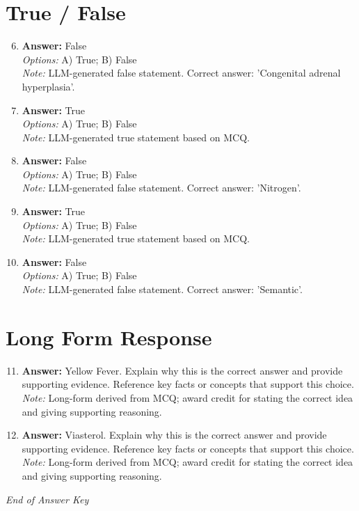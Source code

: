 \documentclass[12pt]{article}
\begin{document}
\section*{True / False}
\begin{enumerate}[label=\arabic*.]
\setcounter{enumi}{5}
\item \textbf{Answer:} False
\\ \textit{Options:} A) True; B) False
\\ \textit{Note:} LLM-generated false statement. Correct answer: 'Congenital adrenal hyperplasia'.
\item \textbf{Answer:} True
\\ \textit{Options:} A) True; B) False
\\ \textit{Note:} LLM-generated true statement based on MCQ.
\item \textbf{Answer:} False
\\ \textit{Options:} A) True; B) False
\\ \textit{Note:} LLM-generated false statement. Correct answer: 'Nitrogen'.
\item \textbf{Answer:} True
\\ \textit{Options:} A) True; B) False
\\ \textit{Note:} LLM-generated true statement based on MCQ.
\item \textbf{Answer:} False
\\ \textit{Options:} A) True; B) False
\\ \textit{Note:} LLM-generated false statement. Correct answer: 'Semantic'.
\end{enumerate}

\section*{Long Form Response}
\begin{enumerate}[label=\arabic*.]
\setcounter{enumi}{10}
\item \textbf{Answer:} Yellow Fever. Explain why this is the correct answer and provide supporting evidence. Reference key facts or concepts that support this choice.
\\ \textit{Note:} Long-form derived from MCQ; award credit for stating the correct idea and giving supporting reasoning.
\item \textbf{Answer:} Viasterol. Explain why this is the correct answer and provide supporting evidence. Reference key facts or concepts that support this choice.
\\ \textit{Note:} Long-form derived from MCQ; award credit for stating the correct idea and giving supporting reasoning.
\end{enumerate}

\vfill
\noindent\textit{End of Answer Key}
\end{document}
